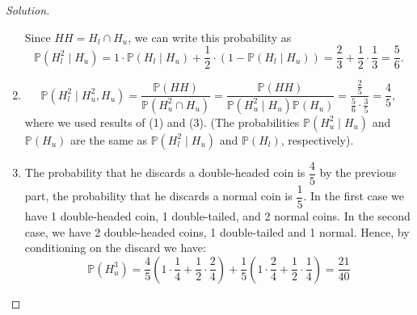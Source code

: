\documentclass[11pt,singlecolumn, openany, citestyle=authoryear]{elegantbook}
\begin{document}
\begin{CJK}{UTF8}{gbsn}
\begin{proof}[Solution]
\begin{enumerate}
    Since $H H=H_l \cap H_u$, we can write this probability as
    $$
    \mathbb{P}\left(H_l^2 \mid H_u\right)=1 \cdot \mathbb{P}\left(H_l \mid H_u\right)+\frac{1}{2} \cdot\left(1-\mathbb{P}\left(H_l \mid H_u\right)\right)=\frac{2}{3}+\frac{1}{2} \cdot \frac{1}{3}=\frac{5}{6} .
    $$
    \item $$
    \mathbb{P}\left(H_l^2 \mid H_u^2, H_u\right)=\frac{\mathbb{P}(H H)}{\mathbb{P}\left(H_u^2 \cap H_u\right)}=\frac{\mathbb{P}(H H)}{\mathbb{P}\left(H_u^2 \mid H_u\right) \mathbb{P}\left(H_u\right)}
    =\frac{\frac{2}{5}}{\frac{5}{6} \cdot \frac{3}{5}}=\frac{4}{5},
    $$
    where we used results of (1) and (3). 
    (The probabilities $\mathbb{P}\left(H_u^2 \mid H_u\right)$ and $\mathbb{P}\left(H_u\right)$ 
    are the same as $\mathbb{P}\left(H_l^2 \mid H_u\right)$ and $\mathbb{P}\left(H_l\right)$, respectively).
    \item The probability that he discards a double-headed coin is $\dfrac{4}{5}$ 
    by the previous part, the probability that he discards a normal coin is 
    $\dfrac{1}{5}$. In the first case we have 1 double-headed coin, 1 double-tailed, 
    and 2 normal coins. In the second case, we have 2 double-headed coins, 1 double-tailed and 1 normal.
    Hence, by conditioning on the discard we have:
    $$
    \mathbb{P}\left(H_u^3\right)=\frac{4}{5}\left(1 \cdot \frac{1}{4}+\frac{1}{2} \cdot \frac{2}{4}\right)+\frac{1}{5}\left(1 \cdot \frac{2}{4}+\frac{1}{2} \cdot \frac{1}{4}\right)=\frac{21}{40}
    $$
\end{enumerate}
\end{proof}


\end{CJK}
\end{document}
